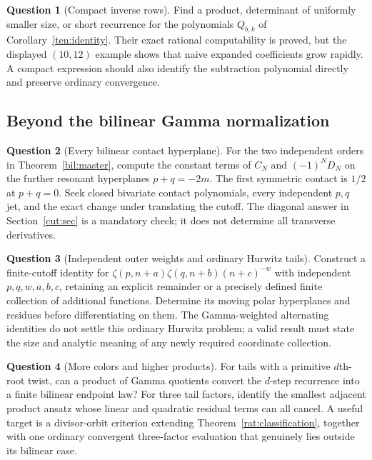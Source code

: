 \documentclass[11pt]{article}
\theoremstyle{definition}
\newtheorem{question}{Question}
\theoremstyle{remark}
\numberwithin{equation}{section}
\begin{document}
\begin{question}[Compact inverse rows]
Find a product, determinant of uniformly smaller size, or short
recurrence for the polynomials $Q_{b,k}$ of
Corollary~\ref{ten:identity}. Their exact rational computability is
proved, but the displayed $(10,12)$ example shows that naive expanded
coefficients grow rapidly. A compact expression should also identify
the subtraction polynomial directly and preserve ordinary convergence.
\end{question}

\subsection{Beyond the bilinear Gamma normalization}

\begin{question}[Every bilinear contact hyperplane]
For the two independent orders in Theorem~\ref{bil:master}, compute
the constant terms of $C_N$ and $(-1)^ND_N$ on the further resonant
hyperplanes $p+q=-2m$. The first symmetric contact is $1/2$ at
$p+q=0$. Seek closed bivariate contact polynomials, every independent
$p,q$ jet, and the exact change under translating the cutoff.
The diagonal answer in Section~\ref{cut:sec} is a mandatory check;
it does not determine all transverse derivatives.
\end{question}

\begin{question}[Independent outer weights and ordinary Hurwitz tails]
Construct a finite-cutoff identity for
$\zeta(p,n+a)\zeta(q,n+b)(n+c)^{-w}$ with independent
$p,q,w,a,b,c$, retaining an explicit remainder or a precisely defined
finite collection of additional functions. Determine its moving
polar hyperplanes and residues before differentiating on them.
The Gamma-weighted alternating identities do not settle this ordinary
Hurwitz problem; a valid result must state the size and analytic
meaning of any newly required coordinate collection.
\end{question}

\begin{question}[More colors and higher products]
For tails with a primitive $d$th-root twist, can a product of Gamma
quotients convert the $d$-step recurrence into a finite bilinear
endpoint law? For three tail factors, identify the smallest adjacent
product ansatz whose linear and quadratic residual terms can all
cancel. A useful target is a divisor-orbit criterion extending
Theorem~\ref{rat:classification}, together with one ordinary convergent
three-factor evaluation that genuinely lies outside its bilinear case.
\end{question}
\end{document}
